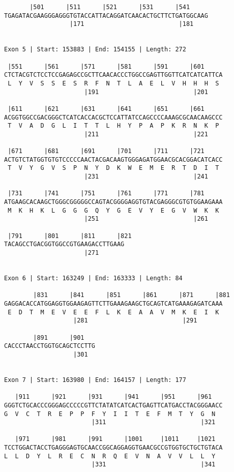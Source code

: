\documentclass{article}
\begin{document}
\begin{Verbatim}
       |501      |511      |521      |531      |541     
TGAGATACGAAGGGAGGGTGTACCATTACAGGATCAACACTGCTTCTGATGGCAAG
                  |171                          |181    
  
 
Exon 5 | Start: 153883 | End: 154155 | Length: 272
 
 |551      |561      |571      |581      |591      |601     
CTCTACGTCTCCTCCGAGAGCCGCTTCAACACCCTGGCCGAGTTGGTTCATCATCATTCA
 L  Y  V  S  S  E  S  R  F  N  T  L  A  E  L  V  H  H  H  S 
                      |191                          |201    
  
 |611      |621      |631      |641      |651      |661     
ACGGTGGCCGACGGGCTCATCACCACGCTCCATTATCCAGCCCCAAAGCGCAACAAGCCC
 T  V  A  D  G  L  I  T  T  L  H  Y  P  A  P  K  R  N  K  P 
                      |211                          |221    
  
 |671      |681      |691      |701      |711      |721     
ACTGTCTATGGTGTGTCCCCCAACTACGACAAGTGGGAGATGGAACGCACGGACATCACC
 T  V  Y  G  V  S  P  N  Y  D  K  W  E  M  E  R  T  D  I  T 
                      |231                          |241    
  
 |731      |741      |751      |761      |771      |781     
ATGAAGCACAAGCTGGGCGGGGGCCAGTACGGGGAGGTGTACGAGGGCGTGTGGAAGAAA
 M  K  H  K  L  G  G  G  Q  Y  G  E  V  Y  E  G  V  W  K  K 
                      |251                          |261    
  
 |791      |801      |811      |821
TACAGCCTGACGGTGGCCGTGAAGACCTTGAAG
                      |271       
  
 
Exon 6 | Start: 163249 | End: 163333 | Length: 84
 
        |831      |841      |851      |861      |871      |881
GAGGACACCATGGAGGTGGAAGAGTTCTTGAAAGAAGCTGCAGTCATGAAAGAGATCAAA
 E  D  T  M  E  V  E  E  F  L  K  E  A  A  V  M  K  E  I  K 
                   |281                          |291       
  
        |891      |901   
CACCCTAACCTGGTGCAGCTCCTTG
                   |301  
  
 
Exon 7 | Start: 163980 | End: 164157 | Length: 177
 
   |911      |921      |931      |941      |951      |961   
GGGTCTGCACCCGGGAGCCCCCGTTCTATATCATCACTGAGTTCATGACCTACGGGAACC
G  V  C  T  R  E  P  P  F  Y  I  I  T  E  F  M  T  Y  G  N  
                        |311                          |321  
  
   |971      |981      |991      |1001     |1011     |1021  
TCCTGGACTACCTGAGGGAGTGCAACCGGCAGGAGGTGAACGCCGTGGTGCTGCTGTACA
L  L  D  Y  L  R  E  C  N  R  Q  E  V  N  A  V  V  L  L  Y  
                        |331                          |341  
  

\end{Verbatim}
\end{document}
